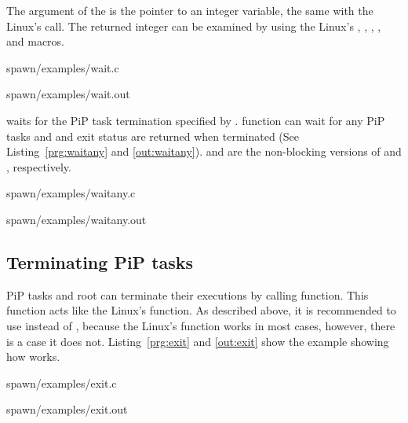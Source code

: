 The argument of the  is the pointer to an integer
variable, the same with the Linux's  call. The
returned integer can be examined by using the Linux's
, , ,
, and  macros. 


                {spawn/examples/wait.c}

 {spawn/examples/wait.out}

 waits for the PiP task termination specified by
        {\PIPID}. 
 function can wait for any PiP tasks and
        {\PIPID} and exit status are returned when terminated (See
        Listing~\ref{prg:waitany} and \ref{out:waitany}).
         and  are
        the non-blocking versions of  and
        , respectively. 


                {spawn/examples/waitany.c}

 {spawn/examples/waitany.out}


\subsection{Terminating PiP tasks}

PiP tasks and root can terminate their executions by calling
 function. This function acts like the Linux's
         function. As described above, it is recommended
        to use  
        instead of , because the Linux's 
        function works in most cases, however, there is a case it does
        not. Listing~\ref{prg:exit} and \ref{out:exit} show the
        example showing how  works.

 {spawn/examples/exit.c}

 {spawn/examples/exit.out}
